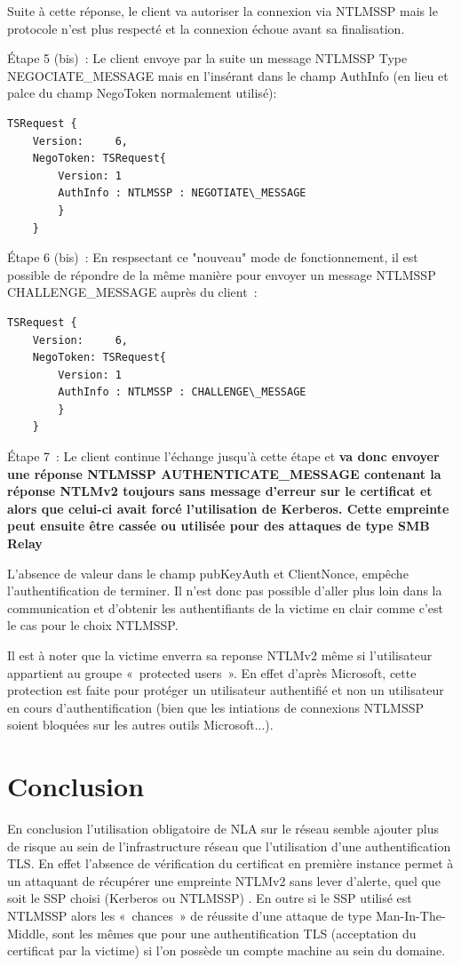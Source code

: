 Suite à cette r\'eponse, le client va autoriser la connexion via NTLMSSP mais le protocole n'est plus respecté et la connexion échoue avant sa finalisation.

Étape 5 (bis) :
Le client envoye par la suite un message NTLMSSP Type NEGOCIATE\_MESSAGE  mais en l'ins\'erant dans le champ AuthInfo (en lieu et palce du champ NegoToken normalement utilisé):

\begin{lstlisting}[frame=single,basicstyle=\tiny]
TSRequest {
	Version:     6,
	NegoToken: TSRequest{
		Version: 1
		AuthInfo : NTLMSSP : NEGOTIATE\_MESSAGE
		}
	}
\end{lstlisting}


Étape 6 (bis) :
En respsectant ce "nouveau" mode de fonctionnement, il est possible de r\'epondre de la même manière pour envoyer un message NTLMSSP CHALLENGE\_MESSAGE  auprès du client :

\begin{lstlisting}[frame=single,basicstyle=\tiny]
TSRequest {
	Version:     6,
	NegoToken: TSRequest{
		Version: 1
		AuthInfo : NTLMSSP : CHALLENGE\_MESSAGE
		}
	}
\end{lstlisting}


Étape 7 :
Le client continue l'\'echange jusqu'à cette étape et \textbf{va donc envoyer une réponse NTLMSSP AUTHENTICATE\_MESSAGE contenant la réponse NTLMv2 toujours sans message d’erreur sur le certificat et alors que celui-ci avait forcé l’utilisation de Kerberos. Cette empreinte peut ensuite être cassée ou utilisée pour des attaques de type SMB Relay}

L’absence de valeur dans le champ pubKeyAuth et ClientNonce, empêche l’authentification de terminer. Il n’est donc pas possible d’aller plus loin dans la communication et d’obtenir les authentifiants de la victime en clair comme c’est le cas pour le choix NTLMSSP.

Il est à noter que la victime enverra sa reponse NTLMv2 même si l’utilisateur appartient au groupe « protected users ». En effet d’après Microsoft, cette protection est faite pour prot\'eger un utilisateur authentifié et non un utilisateur en cours d’authentification (bien que les intiations de connexions NTLMSSP soient bloquées sur les autres outils Microsoft...).

\section{Conclusion}
En conclusion l’utilisation obligatoire de NLA sur le r\'eseau semble ajouter plus de risque au sein de l’infrastructure réseau que l’utilisation d’une authentification TLS.
En effet l’absence de v\'erification du certificat en première instance permet à un attaquant de récupérer une empreinte NTLMv2 sans lever d’alerte, quel que soit le SSP choisi (Kerberos ou NTLMSSP) .
En outre si le SSP utilis\'e est NTLMSSP alors les « chances » de réussite d’une attaque de type Man-In-The-Middle, sont les mêmes que pour une authentification TLS (acceptation du certificat par la victime) si l’on possède un compte machine au sein du domaine.

